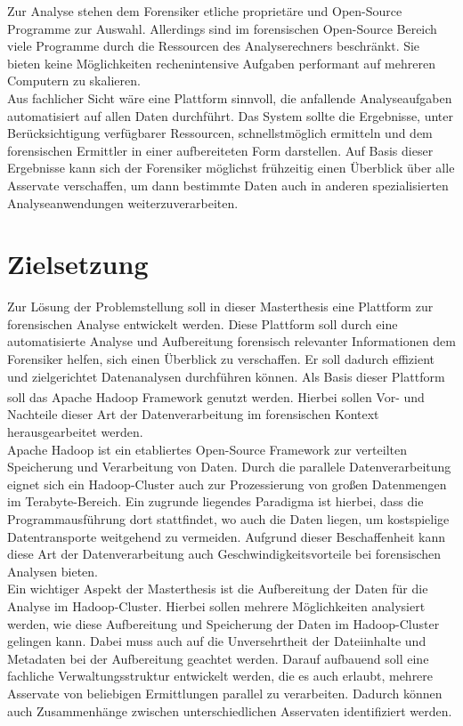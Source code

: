 \noindent
Zur Analyse stehen dem Forensiker etliche proprietäre und Open-Source Programme zur Auswahl. Allerdings sind im forensischen Open-Source Bereich viele Programme durch die Ressourcen des Analyserechners beschränkt. Sie bieten keine Möglichkeiten rechenintensive Aufgaben performant auf mehreren Computern zu skalieren.\\

\noindent
Aus fachlicher Sicht wäre eine Plattform sinnvoll, die anfallende Analyseaufgaben automatisiert auf allen Daten durchführt. Das System sollte die Ergebnisse, unter Berücksichtigung verfügbarer Ressourcen, schnellstmöglich ermitteln und dem forensischen Ermittler in einer aufbereiteten Form darstellen. Auf Basis dieser Ergebnisse kann sich der Forensiker möglichst frühzeitig einen Überblick über alle Asservate verschaffen, um dann bestimmte Daten auch in anderen spezialisierten Analyseanwendungen weiterzuverarbeiten. 

\section{Zielsetzung}
Zur Lösung der Problemstellung soll in dieser Masterthesis eine Plattform zur forensischen Analyse entwickelt werden. Diese Plattform soll durch eine automatisierte Analyse und Aufbereitung forensisch relevanter Informationen dem Forensiker helfen, sich einen Überblick zu verschaffen. Er soll dadurch effizient und zielgerichtet Datenanalysen durchführen können. Als Basis dieser Plattform soll das Apache Hadoop\textsuperscript{\textregistered} Framework genutzt werden. Hierbei sollen Vor- und Nachteile dieser Art der Datenverarbeitung im forensischen Kontext herausgearbeitet werden.\\ 

\noindent
Apache Hadoop ist ein etabliertes Open-Source Framework zur verteilten Speicherung und Verarbeitung von Daten. Durch die parallele Datenverarbeitung eignet sich ein Hadoop-Cluster auch zur Prozessierung von großen Datenmengen im Terabyte-Bereich. Ein zugrunde liegendes Paradigma ist hierbei, dass die Programmausführung dort stattfindet, wo auch die Daten liegen, um kostspielige Datentransporte weitgehend zu vermeiden. Aufgrund dieser Beschaffenheit kann diese Art der Datenverarbeitung auch Geschwindigkeitsvorteile bei forensischen Analysen bieten. \\

\noindent
Ein wichtiger Aspekt der Masterthesis ist die Aufbereitung der Daten für die Analyse im Hadoop-Cluster. Hierbei sollen mehrere Möglichkeiten analysiert werden, wie diese Aufbereitung und Speicherung der Daten im Hadoop-Cluster gelingen kann. Dabei muss auch auf die Unversehrtheit der Dateiinhalte und Metadaten bei der Aufbereitung geachtet werden. Darauf aufbauend soll eine fachliche Verwaltungsstruktur entwickelt werden, die es auch erlaubt, mehrere Asservate von beliebigen Ermittlungen parallel zu verarbeiten. Dadurch können auch Zusammenhänge zwischen unterschiedlichen Asservaten identifiziert werden.\\

